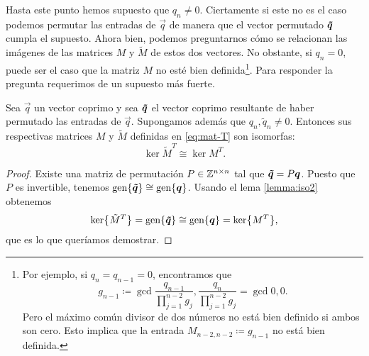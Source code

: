 Hasta este punto hemos supuesto que $q_n \neq 0$. Ciertamente si este no es el caso podemos
permutar las entradas de $\vec{q}$ de manera que el vector permutado $\boldsymbol{\tilde{q}}$ cumpla el
supuesto. Ahora bien, podemos preguntarnos cómo se relacionan las imágenes de las matrices $M$ y
$\tilde{M}$ de estos dos vectores. No obstante, si $q_n = 0$, puede ser el caso que la matriz
$M$ no esté bien definida\footnote{
	Por ejemplo, si $q_n = q_{n-1} = 0$, encontramos que
	\begin{equation*}
		g_{n-1} \coloneq \gcd{\frac{q_{n-1}}{\prod_{j=1}^{n-2}g_j},
		\frac{q_n}{\prod_{j=1}^{n-2}g_j}} = \gcd{0, 0}.
	\end{equation*}
	Pero el máximo común divisor de dos números no está bien definido si ambos son cero. Esto
	implica que la entrada $M_{n-2, n-2} \coloneq g_{n-1}$ no está bien definida.
}. Para responder la pregunta requerimos de un supuesto más fuerte.
\begin{corollary}
	\label{cor:iso3}
	Sea $\vec{q}$ un vector coprimo y sea $\boldsymbol{\tilde{q}}$ el vector coprimo resultante de haber
	permutado las entradas de $\vec{q}$. Supongamos además que $q_n, \tilde{q}_n \neq 0$.
	Entonces sus respectivas matrices $M$ y $\tilde{M}$ definidas en \eqref{eq:mat-T} son isomorfas:
	\begin{equation*}
		\ker{\tilde{M}^T} \cong \ker{M^T}.
	\end{equation*}
\end{corollary}
\begin{proof}
	Existe una matriz de permutación $P \in \mathbb{Z}^{n \times n}$ tal que $\boldsymbol{\tilde{q}} = P\boldsymbol{q}$.
	Puesto que $P$ es invertible, tenemos $\operatorname{gen}\lbrace \boldsymbol{\tilde{q}} \rbrace \cong
	\operatorname{gen}\lbrace \boldsymbol{q} \rbrace$. Usando el lema \ref{lemma:iso2} obtenemos
	\begin{equation*}
		\mathop{\mathrm{ker}{\left\lbrace \tilde{M}^T \right\rbrace}} = \operatorname{gen}\lbrace \boldsymbol{\tilde{q}} \rbrace \cong \operatorname{gen}\lbrace \boldsymbol{q} \rbrace = \mathop{\mathrm{ker}{\left\lbrace M^T \right\rbrace}},
	\end{equation*}
	que es lo que queríamos demostrar.
\end{proof}
